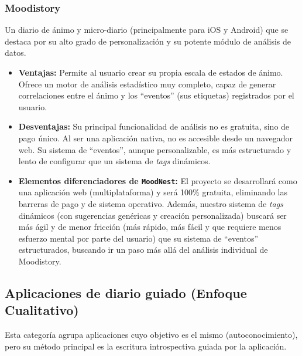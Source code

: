 \subsubsection{Moodistory \cite{app:moodistory}}
Un diario de ánimo y micro-diario (principalmente para iOS y Android) que se destaca por su alto grado de personalización y su potente módulo de análisis de datos.
\begin{itemize}
    \item \textbf{Ventajas:} Permite al usuario crear su propia escala de estados de ánimo. Ofrece un motor de análisis estadístico muy completo, capaz de generar correlaciones entre el ánimo y los ``eventos'' (sus etiquetas) registrados por el usuario.
    \item \textbf{Desventajas:} Su principal funcionalidad de análisis no es gratuita, sino de pago único. Al ser una aplicación nativa, no es accesible desde un navegador web. Su sistema de ``eventos'', aunque personalizable, es más estructurado y lento de configurar que un sistema de \textit{tags} dinámicos.
    \item \textbf{Elementos diferenciadores de \texttt{MoodNest}:} El proyecto se desarrollará como una aplicación web (multiplataforma) y será 100\% gratuita, eliminando las barreras de pago y de sistema operativo. Además, nuestro sistema de \textit{tags} dinámicos (con sugerencias genéricas y creación personalizada) buscará ser más ágil y de menor fricción (más rápido, más fácil y que requiere menos esfuerzo mental por parte del usuario) que su sistema de ``eventos'' estructurados, buscando ir un paso más allá del análisis individual de Moodistory.
\end{itemize}

\subsection{Aplicaciones de diario guiado (Enfoque Cualitativo)}

Esta categoría agrupa aplicaciones cuyo objetivo es el mismo (autoconocimiento), pero su método principal es la escritura introspectiva guiada por la aplicación.


